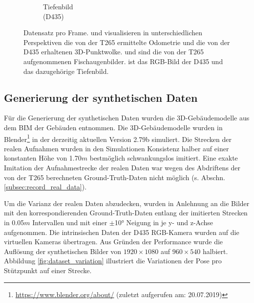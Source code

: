 \begin{figure}
\begin{subfigure}[t]{0.3\linewidth}
		\caption{Tiefenbild \\ (D435) \hspace*{2cm}}
		\label{subfig:depth-image}
	\end{subfigure}
	\caption{Datensatz pro Frame.  und  visualisieren in unterschiedlichen Perspektiven die von der T265 ermittelte Odometrie und die von der D435 erhaltenen 3D-Punktwolke.  und  sind die von der T265 aufgenommenen Fischaugenbilder.  ist das RGB-Bild der D435 und  das dazugehörige Tiefenbild. }
	\label{fig:dataset}
\end{figure}

\subsection{Generierung der synthetischen Daten}
\label{subsec:generate_synth_images}
Für die Generierung der synthetischen Daten wurden die 3D-Gebäudemodelle aus dem BIM der Gebäuden entnommen. Die 3D-Gebäudemodelle wurden in Blender\footnote{\url{https://www.blender.org/about/} (zuletzt aufgerufen am: 20.07.2019)} in der derzeitig aktuellen Version 2.79b simuliert. Die Strecken der realen Aufnahmen wurden in den Simulationen Konsistenz halber auf einer konstanten Höhe von 1.70$m$ bestmöglich schwankungslos imitiert. Eine exakte Imitation der Aufnahmestrecke der realen Daten war wegen des Abdriftens der von der T265 berechneten Ground-Truth-Daten nicht möglich (s. Abschn. \ref{subsec:record_real_data}).

Um die Varianz der realen Daten abzudecken, wurden in Anlehnung an \citet{acharyaBIMPoseNetIndoorCamera2019} die Bilder mit den korrespondierenden Ground-Truth-Daten entlang der imitierten Strecken in 0.05$m$ Intervallen und mit einer $\pm$10° Neigung in je y- und z-Achse aufgenommen. Die intrinsischen Daten der D435 RGB-Kamera wurden auf die virtuellen Kameras übertragen. Aus Gründen der Performance wurde die Auflösung der synthetischen Bilder von $1920\times1080$ auf $960\times540$ halbiert. Abbildung \ref{fig:dataset_variation} illustriert die Variationen der Pose pro Stützpunkt auf einer Strecke.


